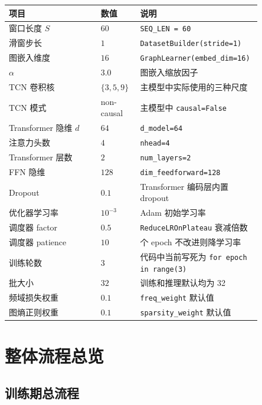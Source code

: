 \documentclass[UTF8]{ctexart}
\begin{document}
\begin{longtable}{>{\raggedright\arraybackslash}p{0.35\linewidth} >{\raggedright\arraybackslash}p{0.15\linewidth} >{\raggedright\arraybackslash}p{0.35\linewidth}}
\toprule
项目 & 数值 & 说明 \\
\midrule
\endhead
窗口长度 $S$ & $60$ & \texttt{SEQ\_LEN = 60} \\
滑窗步长 & $1$ & \texttt{DatasetBuilder(stride=1)} \\
图嵌入维度 & $16$ & \texttt{GraphLearner(embed\_dim=16)} \\
$\alpha$ & $3.0$ & 图嵌入缩放因子 \\
TCN 卷积核 & $\{3,5,9\}$ & 主模型中实际使用的三种尺度 \\
TCN 模式 & non-causal & 主模型中 \texttt{causal=False} \\
Transformer 隐维 $d$ & $64$ & \texttt{d\_model=64} \\
注意力头数 & $4$ & \texttt{nhead=4} \\
Transformer 层数 & $2$ & \texttt{num\_layers=2} \\
FFN 隐维 & $128$ & \texttt{dim\_feedforward=128} \\
Dropout & $0.1$ & Transformer 编码层内置 dropout \\
优化器学习率 & $10^{-3}$ & Adam 初始学习率 \\
调度器 factor & $0.5$ & \texttt{ReduceLROnPlateau} 衰减倍数 \\
调度器 patience & $10$ & 10 个 epoch 不改进则降学习率 \\
训练轮数 & $3$ & 代码中当前写死为 \texttt{for epoch in range(3)} \\
批大小 & $32$ & 训练和推理默认均为 32 \\
频域损失权重 & $0.1$ & \texttt{freq\_weight} 默认值 \\
图熵正则权重 & $0.1$ & \texttt{sparsity\_weight} 默认值 \\
\bottomrule
\end{longtable}

\section{整体流程总览}

\subsection{训练期总流程}
\end{document}
